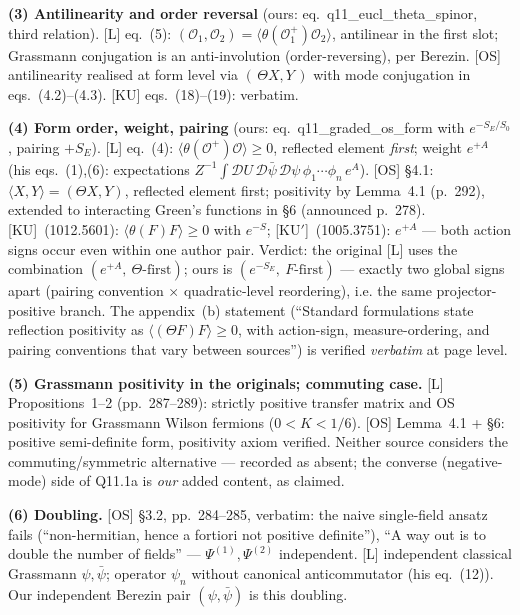 \textbf{(3) Antilinearity and order reversal} (ours:
eq.~q11\_eucl\_theta\_spinor, third relation).
[L] eq.~(5): $(\mathcal O_1,\mathcal O_2)
=\langle\theta(\mathcal O_1^+)\mathcal O_2\rangle$, antilinear in
the first slot; Grassmann conjugation is an anti-involution
(order-reversing), per Berezin.
[OS] antilinearity realised at form level via
$(\,\Theta X,Y\,)$ with mode conjugation in eqs.~(4.2)--(4.3).
[KU] eqs.~(18)--(19): verbatim.

\textbf{(4) Form order, weight, pairing} (ours:
eq.~q11\_graded\_os\_form with $e^{-S_E/S_0}$, pairing $+S_E$).
[L] eq.~(4): $\langle\theta(\mathcal O^+)\mathcal O\rangle\ge0$,
reflected element \emph{first}; weight $e^{+A}$ (his eqs.~(1),(6):
expectations $Z^{-1}\!\int\!\mathcal DU\,\mathcal D\bar\psi\,
\mathcal D\psi\,\phi_1\cdots\phi_n\,e^{A}$).
[OS] \S4.1: $\langle X,Y\rangle=(\Theta X,Y)$, reflected element
first; positivity by Lemma~4.1 (p.~292), extended to interacting
Green's functions in \S6 (announced p.~278).
[KU]~(1012.5601): $\langle\theta(F)F\rangle\ge0$ with $e^{-S}$;
[KU$'$]~(1005.3751): $e^{+A}$ --- both action signs occur even
within one author pair.
Verdict: the original [L] uses the combination
$(e^{+A},\ \Theta\text{-first})$; ours is
$(e^{-S_E},\ F\text{-first})$ --- exactly two global signs apart
(pairing convention $\times$ quadratic-level reordering), i.e. the
same projector-positive branch.
The appendix~(b) statement (``Standard formulations state
reflection positivity as $\langle(\Theta F)F\rangle\ge0$, with
action-sign, measure-ordering, and pairing conventions that vary
between sources'') is verified \emph{verbatim} at page level.

\textbf{(5) Grassmann positivity in the originals; commuting case.}
[L] Propositions~1--2 (pp.~287--289): strictly positive transfer
matrix and OS positivity for Grassmann Wilson fermions
($0<K<1/6$).
[OS] Lemma~4.1 + \S6: positive semi-definite form, positivity
axiom verified.
Neither source considers the commuting/symmetric alternative ---
recorded as absent; the converse (negative-mode) side of Q11.1a is
\emph{our} added content, as claimed.

\textbf{(6) Doubling.}
[OS] \S3.2, pp.~284--285, verbatim: the naive single-field ansatz
fails (``non-hermitian, hence a fortiori not positive definite''),
``A way out is to double the number of fields'' ---
$\Psi^{(1)},\Psi^{(2)}$ independent.
[L] independent classical Grassmann $\psi,\bar\psi$; operator
$\psi_n$ without canonical anticommutator (his eq.~(12)).
Our independent Berezin pair $(\psi,\bar\psi)$ is this doubling.

